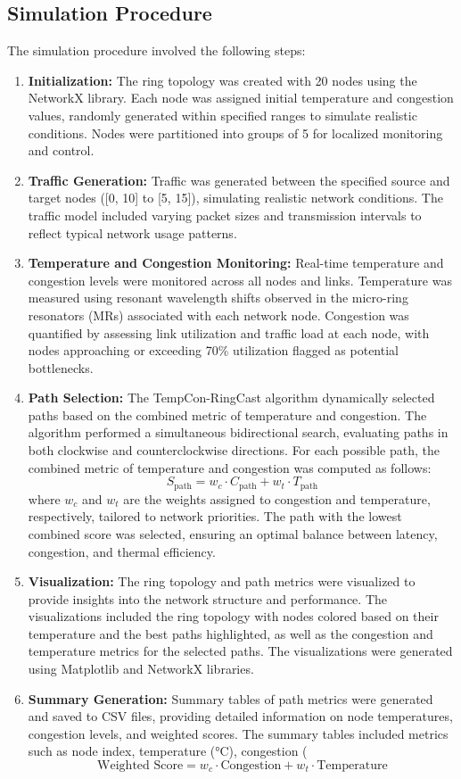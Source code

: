 \documentclass[conference]{IEEEtran}
\begin{document}
\subsection{Simulation Procedure}
The simulation procedure involved the following steps:
\begin{enumerate}
    \item \textbf{Initialization:} The ring topology was created with 20 nodes using the NetworkX library. Each node was assigned initial temperature and congestion values, randomly generated within specified ranges to simulate realistic conditions. Nodes were partitioned into groups of 5 for localized monitoring and control.
    \item \textbf{Traffic Generation:} Traffic was generated between the specified source and target nodes ([0, 10] to [5, 15]), simulating realistic network conditions. The traffic model included varying packet sizes and transmission intervals to reflect typical network usage patterns.
    \item \textbf{Temperature and Congestion Monitoring:} Real-time temperature and congestion levels were monitored across all nodes and links. Temperature was measured using resonant wavelength shifts observed in the micro-ring resonators (MRs) associated with each network node. Congestion was quantified by assessing link utilization and traffic load at each node, with nodes approaching or exceeding 70\% utilization flagged as potential bottlenecks.
    \item \textbf{Path Selection:} The TempCon-RingCast algorithm dynamically selected paths based on the combined metric of temperature and congestion. The algorithm performed a simultaneous bidirectional search, evaluating paths in both clockwise and counterclockwise directions. For each possible path, the combined metric of temperature and congestion was computed as follows:
    \[
    S_{\text{path}} = w_c \cdot C_{\text{path}} + w_t \cdot T_{\text{path}}
    \]
    where $w_c$ and $w_t$ are the weights assigned to congestion and temperature, respectively, tailored to network priorities. The path with the lowest combined score was selected, ensuring an optimal balance between latency, congestion, and thermal efficiency.
    \item \textbf{Visualization:} The ring topology and path metrics were visualized to provide insights into the network structure and performance. The visualizations included the ring topology with nodes colored based on their temperature and the best paths highlighted, as well as the congestion and temperature metrics for the selected paths. The visualizations were generated using Matplotlib and NetworkX libraries.
    \item \textbf{Summary Generation:} Summary tables of path metrics were generated and saved to CSV files, providing detailed information on node temperatures, congestion levels, and weighted scores. The summary tables included metrics such as node index, temperature (°C), congestion (%
    \[
    \text{Weighted Score} = w_c \cdot \text{Congestion} + w_t \cdot \text{Temperature}
    \]
\end{enumerate}
\end{document}

